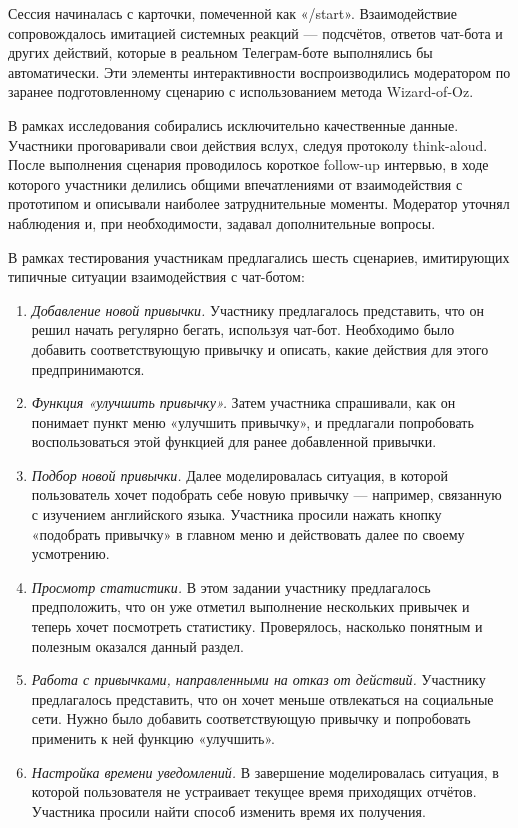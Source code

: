 \documentclass[pdflatex,sn-mathphys-num]{sn-jnl}%
\theoremstyle{thmstyleone}%
\theoremstyle{thmstyletwo}%
\theoremstyle{thmstylethree}%
\begin{document}
Сессия начиналась с карточки, помеченной как «/start». Взаимодействие сопровождалось имитацией системных реакций — подсчётов, ответов чат-бота и других действий, которые в реальном Телеграм-боте выполнялись бы автоматически. Эти элементы интерактивности воспроизводились модератором по заранее подготовленному сценарию с использованием метода Wizard-of-Oz.

В рамках исследования собирались исключительно качественные данные. Участники проговаривали свои действия вслух, следуя протоколу think-aloud. После выполнения сценария проводилось короткое follow-up интервью, в ходе которого участники делились общими впечатлениями от взаимодействия с прототипом и описывали наиболее затруднительные моменты. Модератор уточнял наблюдения и, при необходимости, задавал дополнительные вопросы.

В рамках тестирования участникам предлагались шесть сценариев, имитирующих типичные ситуации взаимодействия с чат-ботом:

\begin{enumerate}
    \item \textit{Добавление новой привычки.} Участнику предлагалось представить, что он решил начать регулярно бегать, используя чат-бот. Необходимо было добавить соответствующую привычку и описать, какие действия для этого предпринимаются.
    
    \item \textit{Функция «улучшить привычку».} Затем участника спрашивали, как он понимает пункт меню «улучшить привычку», и предлагали попробовать воспользоваться этой функцией для ранее добавленной привычки.
    
    \item \textit{Подбор новой привычки.} Далее моделировалась ситуация, в которой пользователь хочет подобрать себе новую привычку — например, связанную с изучением английского языка. Участника просили нажать кнопку «подобрать привычку» в главном меню и действовать далее по своему усмотрению.
    
    \item \textit{Просмотр статистики.} В этом задании участнику предлагалось предположить, что он уже отметил выполнение нескольких привычек и теперь хочет посмотреть статистику. Проверялось, насколько понятным и полезным оказался данный раздел.
    
    \item \textit{Работа с привычками, направленными на отказ от действий.} Участнику предлагалось представить, что он хочет меньше отвлекаться на социальные сети. Нужно было добавить соответствующую привычку и попробовать применить к ней функцию «улучшить».
    
    \item \textit{Настройка времени уведомлений.} В завершение моделировалась ситуация, в которой пользователя не устраивает текущее время приходящих отчётов. Участника просили найти способ изменить время их получения.
\end{enumerate}
\end{document}
